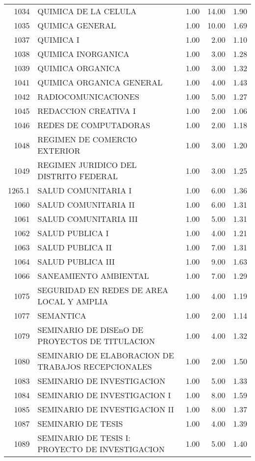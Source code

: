 \documentclass[12pt]{article}
\begin{document}
\begin{table}[ht]
\begin{tabular}{rlrrr}
  1034 & QUIMICA DE LA CELULA & 1.00 & 14.00 & 1.90 \\ 
  1035 & QUIMICA GENERAL & 1.00 & 10.00 & 1.69 \\ 
  1037 & QUIMICA I & 1.00 & 2.00 & 1.10 \\ 
  1038 & QUIMICA INORGANICA & 1.00 & 3.00 & 1.28 \\ 
  1039 & QUIMICA ORGANICA & 1.00 & 3.00 & 1.32 \\ 
  1041 & QUIMICA ORGANICA GENERAL & 1.00 & 4.00 & 1.43 \\ 
  1042 & RADIOCOMUNICACIONES & 1.00 & 5.00 & 1.27 \\ 
  1045 & REDACCION CREATIVA I & 1.00 & 2.00 & 1.06 \\ 
  1046 & REDES DE COMPUTADORAS & 1.00 & 2.00 & 1.18 \\ 
  1048 & REGIMEN DE COMERCIO EXTERIOR & 1.00 & 3.00 & 1.20 \\ 
  1049 & REGIMEN JURIDICO DEL DISTRITO FEDERAL & 1.00 & 3.00 & 1.25 \\ 
  1265.1 & SALUD COMUNITARIA I & 1.00 & 6.00 & 1.36 \\ 
  1060 & SALUD COMUNITARIA II & 1.00 & 6.00 & 1.31 \\ 
  1061 & SALUD COMUNITARIA III & 1.00 & 5.00 & 1.31 \\ 
  1062 & SALUD PUBLICA I & 1.00 & 4.00 & 1.21 \\ 
  1063 & SALUD PUBLICA II & 1.00 & 7.00 & 1.31 \\ 
  1064 & SALUD PUBLICA III & 1.00 & 9.00 & 1.63 \\ 
  1066 & SANEAMIENTO AMBIENTAL & 1.00 & 7.00 & 1.29 \\ 
  1075 & SEGURIDAD EN REDES DE AREA LOCAL Y AMPLIA & 1.00 & 4.00 & 1.19 \\ 
  1077 & SEMANTICA & 1.00 & 2.00 & 1.14 \\ 
  1079 & SEMINARIO DE DISEnO DE PROYECTOS DE TITULACION & 1.00 & 4.00 & 1.32 \\ 
  1080 & SEMINARIO DE ELABORACION DE TRABAJOS RECEPCIONALES & 1.00 & 2.00 & 1.50 \\ 
  1083 & SEMINARIO DE INVESTIGACION & 1.00 & 5.00 & 1.33 \\ 
  1084 & SEMINARIO DE INVESTIGACION I & 1.00 & 8.00 & 1.59 \\ 
  1085 & SEMINARIO DE INVESTIGACION II & 1.00 & 8.00 & 1.37 \\ 
  1087 & SEMINARIO DE TESIS & 1.00 & 4.00 & 1.39 \\ 
  1089 & SEMINARIO DE TESIS I: PROYECTO DE INVESTIGACION & 1.00 & 5.00 & 1.40 \\ 

\end{tabular}
\end{table}
\end{document}
